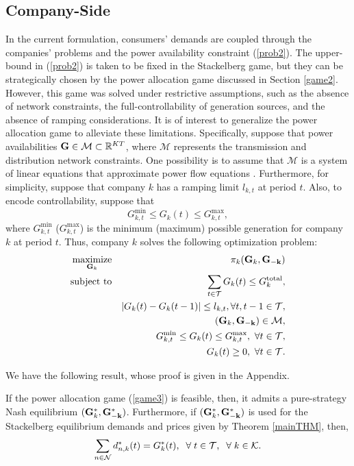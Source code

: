 \subsection{Company-Side}

{\color{black} In the current formulation, consumers' demands are coupled through the companies' problems and the power availability constraint (\ref{prob2}). The upper-bound in (\ref{prob2}) is taken to be fixed in the Stackelberg game, but they can be strategically chosen by the power allocation game discussed in Section \ref{game2}. However, this game was solved under restrictive assumptions, such as the absence of network constraints, the full-controllability of generation sources, and the absence of ramping considerations. It is of interest to generalize the power allocation game to alleviate these limitations. Specifically, suppose that power availabilities ${\bf {G}} \in \mathcal{M} \subset \mathbb{R}^{KT}$, where $\mathcal{M}$ represents the transmission and distribution network constraints. One possibility is to assume that $\mathcal{M}$ is a system of linear equations  that approximate power flow equations \cite{eugene,eugene2,eugene3,baran,bolognani}. Furthermore, for simplicity, suppose that company $k$ has a ramping limit $l_{k,t}$ at period $t$. Also, to encode controllability, suppose that $$G^{\min}_{k,t} \leq G_k(t) \leq G^{\max}_{k,t},$$
where $G^{\min}_{k,t}$ ($G^{\max}_{k,t}$) is the minimum (maximum) possible generation  for company $k$ at period $t$.  Thus, company $k$ solves the following optimization problem:
 \begin{eqnarray}
\underset{\mathbf{G}_k }{\hbox{maximize}} && \pi_k({\bf{G}}_k,{\bf{G_{-k}}})
\nonumber \\
\hbox{subject to} && \sum_{t\in {\cal T}}G_k(t) \leq G^{{\rm total}}_k,  \nonumber\\
&& \vert G_k(t)-G_k(t-1)\vert \leq l_{k,t}, \forall t, t-1 \in{\cal T}, \nonumber \\
&& ({\bf{G}}_k,{\bf{G_{-k}}}) \in \mathcal{M}, \label{game3} \\
&& G^{\min}_{k,t} \leq G_k(t) \leq G^{\max}_{k,t},  \ \forall t\in{\cal T}, \nonumber\\
&& G_k(t)\geq0, \ \forall t\in{\cal T}. \nonumber\end{eqnarray}

We have the following result, whose proof is given in the Appendix. 
\begin{theorem}
If the power allocation game (\ref{game3}) is feasible, then, it admits a pure-strategy Nash equilibrium $({\bf{G}}^*_k,{\bf{G^*_{-k}}})$. Furthermore, if $({\bf{G}}^*_k,{\bf{G^*_{-k}}})$ is used for the Stackelberg equilibrium demands and prices given by Theorem \ref{mainTHM}, then, $$\sum_{n\in {\cal N}} d^*_{n,k}(t) = G^*_k(t),\;\; \forall \; t \in {\cal T},\;\; \forall \; k \in {\cal K}.$$ \label{ThmGame3}
\end{theorem}

}
